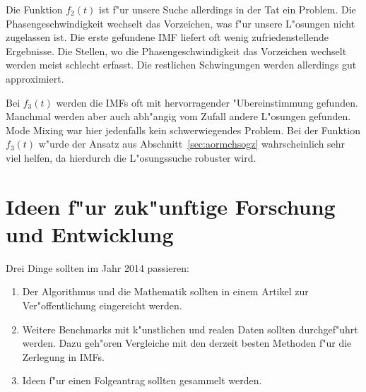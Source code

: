 \documentclass[a4paper]{scrartcl}
\begin{document}
Die Funktion $f_2(t)$ ist f"ur unsere Suche allerdings in der Tat ein Problem. 
Die Phasengeschwindigkeit wechselt das Vorzeichen, was f"ur unsere L"osungen nicht zugelassen ist. 
Die erste gefundene IMF liefert oft wenig zufriedenstellende Ergebnisse. 
Die Stellen, wo die Phasengeschwindigkeit das Vorzeichen wechselt werden meist schlecht erfasst. 
Die restlichen Schwingungen werden allerdings gut approximiert. 

Bei $f_3(t)$ werden die IMFs oft mit hervorragender "Ubereinstimmung gefunden. 
Manchmal werden aber auch abh"angig vom Zufall andere L"osungen gefunden. 
Mode Mixing war hier jedenfalls kein schwerwiegendes Problem. 
Bei der Funktion $f_3(t)$ w"urde der Ansatz aus Abschnitt~\ref{sec:aormchsogz} wahrscheinlich sehr viel helfen, da hierdurch die L"osungssuche robuster wird. 


\section{Ideen f"ur zuk"unftige Forschung und Entwicklung}

Drei Dinge sollten im Jahr 2014 passieren:
\begin{enumerate}
  \item Der Algorithmus und die Mathematik sollten in einem Artikel zur Ver"offentlichung eingereicht werden. 
  \item Weitere Benchmarks mit k"unstlichen und realen Daten sollten durchgef"uhrt werden. 
  Dazu geh"oren Vergleiche mit den derzeit besten Methoden f"ur die Zerlegung in IMFs. 
  \item Ideen f"ur einen Folgeantrag sollten gesammelt werden. 
\end{enumerate}




\end{document}
